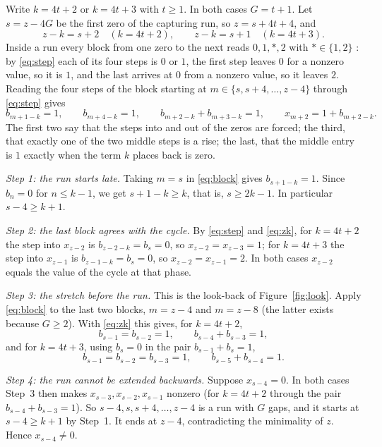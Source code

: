 \documentclass[11pt]{amsart}
\theoremstyle{definition}
\begin{document}
Write $k=4t+2$ or $k=4t+3$ with $t\ge1$. In both cases $G=t+1$. Let $s=z-4G$ be the first zero of the capturing
run, so $z=s+4t+4$, and
\begin{equation}\label{eq:zk}
z-k=s+2\quad(k=4t+2),\qquad z-k=s+1\quad(k=4t+3).
\end{equation}
Inside a run every block from one zero to the next reads $0,1,*,2$ with $*\in\{1,2\}$ \cite[Lemma~17]{F26}:
by \eqref{eq:step} each of its four steps is $0$ or $1$, the first step leaves $0$ for a nonzero value, so it is
$1$, and the last arrives at $0$ from a nonzero value, so it leaves $2$. Reading the four steps of the block
starting at $m\in\{s,s+4,\dots,z-4\}$ through \eqref{eq:step} gives
\begin{equation}\label{eq:block}
b_{m+1-k}=1,\qquad b_{m+4-k}=1,\qquad b_{m+2-k}+b_{m+3-k}=1,\qquad x_{m+2}=1+b_{m+2-k}.
\end{equation}
The first two say that the steps into and out of the zeros are forced; the third, that exactly one of the two
middle steps is a rise; the last, that the middle entry is $1$ exactly when the term $k$ places back is zero.

\emph{Step 1: the run starts late.} Taking $m=s$ in \eqref{eq:block} gives $b_{s+1-k}=1$. Since $b_n=0$ for
$n\le k-1$, we get $s+1-k\ge k$, that is, $s\ge2k-1$. In particular $s-4\ge k+1$.

\emph{Step 2: the last block agrees with the cycle.} By \eqref{eq:step} and \eqref{eq:zk}, for $k=4t+2$ the step
into $x_{z-2}$ is $b_{z-2-k}=b_s=0$, so $x_{z-2}=x_{z-3}=1$; for $k=4t+3$ the step into $x_{z-1}$ is
$b_{z-1-k}=b_s=0$, so $x_{z-2}=x_{z-1}=2$. In both cases $x_{z-2}$ equals the value of the cycle at that phase.

\emph{Step 3: the stretch before the run.} This is the look-back of Figure~\ref{fig:look}. Apply
\eqref{eq:block} to the last two blocks, $m=z-4$ and $m=z-8$
(the latter exists because $G\ge2$). With \eqref{eq:zk} this gives, for $k=4t+2$,
\[
b_{s-1}=b_{s-2}=1,\qquad b_{s-4}+b_{s-3}=1,
\]
and for $k=4t+3$, using $b_s=0$ in the pair $b_{s-1}+b_s=1$,
\[
b_{s-1}=b_{s-2}=b_{s-3}=1,\qquad b_{s-5}+b_{s-4}=1.
\]

\emph{Step 4: the run cannot be extended backwards.} Suppose $x_{s-4}=0$. In both cases Step~3 then makes
$x_{s-3},x_{s-2},x_{s-1}$ nonzero (for $k=4t+2$ through the pair $b_{s-4}+b_{s-3}=1$). So $s-4,s,s+4,\dots,z-4$ is
a run with $G$ gaps, and it starts at $s-4\ge k+1$ by Step~1. It ends at $z-4$, contradicting the minimality of
$z$. Hence $x_{s-4}\neq0$.
\end{document}
